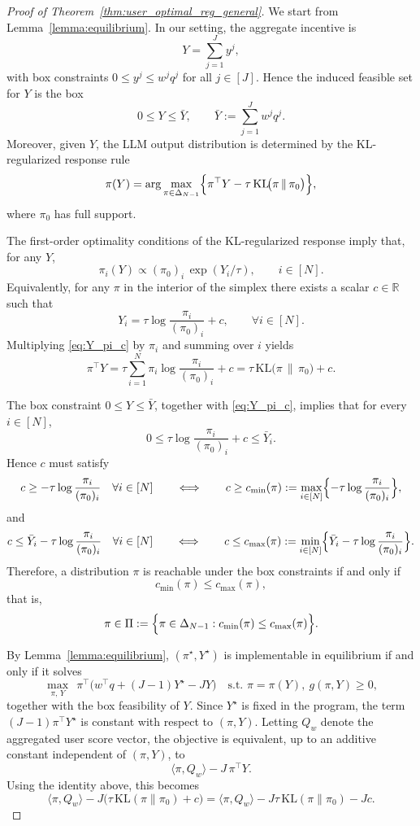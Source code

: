 \documentclass{article}
\begin{document}
\begin{proof}[Proof of Theorem~\ref{thm:user_optimal_reg_general}]
We start from Lemma~\ref{lemma:equilibrium}. In our setting, the aggregate incentive is
\[
Y=\sum_{j=1}^J y^j,
\]
with box constraints \(0\le y^j\le w^j q^j\) for all \(j\in[J]\). Hence the induced feasible set for \(Y\) is the box
\[
0\le Y \le \bar Y,
\qquad
\bar Y:=\sum_{j=1}^J w^j q^j.
\]
Moreover, given \(Y\), the LLM output distribution is determined by the KL-regularized response rule
\[
\pi(Y)=\arg\max_{\pi\in\Delta_{N-1}}
\Bigl\{\pi^\top Y-\tau\,\mathrm{KL}\!\bigl(\pi\,\|\,\pi_0\bigr)\Bigr\},
\]
where \(\pi_0\) has full support.

The first-order optimality conditions of the KL-regularized response imply that, for any \(Y\),
\[
\pi_i(Y)\propto (\pi_0)_i\,\exp(Y_i/\tau),
\qquad i\in[N].
\]
Equivalently, for any \(\pi\) in the interior of the simplex there exists a scalar \(c\in\mathbb R\) such that
\begin{equation}\label{eq:Y_pi_c}
Y_i=\tau\log\frac{\pi_i}{(\pi_0)_i}+c,
\qquad \forall i\in[N].
\end{equation}
Multiplying \eqref{eq:Y_pi_c} by \(\pi_i\) and summing over \(i\) yields
\[
\pi^\top Y
=
\tau\sum_{i=1}^N \pi_i\log\frac{\pi_i}{(\pi_0)_i}+c
=
\tau\,\mathrm{KL}\!\bigl(\pi\,\|\,\pi_0\bigr)+c.
\]

The box constraint \(0\le Y\le \bar Y\), together with \eqref{eq:Y_pi_c}, implies that for every \(i\in[N]\),
\[
0\le \tau\log\frac{\pi_i}{(\pi_0)_i}+c \le \bar Y_i.
\]
Hence \(c\) must satisfy
\[
c\ge -\tau\log\frac{\pi_i}{(\pi_0)_i}
\quad \forall i\in[N]
\qquad\Longleftrightarrow\qquad
c\ge c_{\min}(\pi):=\max_{i\in[N]}\Bigl\{-\tau\log\frac{\pi_i}{(\pi_0)_i}\Bigr\},
\]
and
\[
c\le \bar Y_i-\tau\log\frac{\pi_i}{(\pi_0)_i}
\quad \forall i\in[N]
\qquad\Longleftrightarrow\qquad
c\le c_{\max}(\pi):=\min_{i\in[N]}\Bigl\{\bar Y_i-\tau\log\frac{\pi_i}{(\pi_0)_i}\Bigr\}.
\]
Therefore, a distribution \(\pi\) is reachable under the box constraints if and only if
\[
c_{\min}(\pi)\le c_{\max}(\pi),
\]
that is,
\[
\pi\in\Pi:=\Bigl\{\pi\in\Delta_{N-1}: c_{\min}(\pi)\le c_{\max}(\pi)\Bigr\}.
\]

By Lemma~\ref{lemma:equilibrium}, \((\pi^\star,Y^\star)\) is implementable in equilibrium if and only if it solves
\[
\max_{\pi,\,Y}\ \ \pi^\top\bigl(w^\top q+(J-1)Y^\star-JY\bigr)
\quad\text{s.t. }\pi=\pi(Y),\ g(\pi,Y)\ge 0,
\]
together with the box feasibility of \(Y\).
Since \(Y^\star\) is fixed in the program, the term \((J-1)\pi^\top Y^\star\) is constant with respect to \((\pi,Y)\).
Letting \(Q_w\) denote the aggregated user score vector, the objective is equivalent, up to an additive constant independent of \((\pi,Y)\), to
\[
\langle \pi,Q_w\rangle - J\,\pi^\top Y.
\]
Using the identity above, this becomes
\[
\langle \pi,Q_w\rangle - J\bigl(\tau\,\mathrm{KL}(\pi\|\pi_0)+c\bigr)
=
\langle \pi,Q_w\rangle
- J\tau\,\mathrm{KL}(\pi\|\pi_0)
- Jc.
\]


\end{proof}
\end{document}
